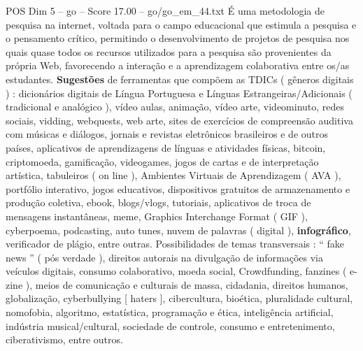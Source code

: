 \begin{textsample}{POS Dim 5 – go – Score 17.00 – go/go\_em\_44.txt}
É uma metodologia de pesquisa na internet, voltada para o campo educacional que estimula a pesquisa e o pensamento crítico, permitindo o desenvolvimento de projetos de pesquisa nos quais quase todos os recursos utilizados para a pesquisa são provenientes da própria Web, favorecendo a interação e a aprendizagem colaborativa entre os/as estudantes. \textbf{Sugestões} de ferramentas que compõem as TDICs ( gêneros digitais ) : dicionários digitais de Língua Portuguesa e Línguas Estrangeiras/Adicionais ( tradicional e analógico ), vídeo aulas, animação, vídeo arte, videominuto, redes sociais, vidding, webquests, web arte, sites de exercícios de compreensão auditiva com músicas e diálogos, jornais e revistas eletrônicos brasileiros e de outros países, aplicativos de aprendizagens de línguas e atividades físicas, bitcoin, criptomoeda, gamificação, videogames, jogos de cartas e de interpretação artística, tabuleiros ( on line ), Ambientes Virtuais de Aprendizagem ( AVA ), portfólio interativo, jogos educativos, dispositivos gratuitos de armazenamento e produção coletiva, ebook, blogs/vlogs, tutoriais, aplicativos de troca de mensagens instantâneas, meme, Graphics Interchange Format ( GIF ), cyberpoema, podcasting, auto tunes, nuvem de palavras ( digital ), \textbf{infográfico}, verificador de plágio, entre outras.
Possibilidades de temas transversais : “ fake news ” ( pós verdade ), direitos autorais na divulgação de informações via veículos digitais, consumo colaborativo, moeda social, Crowdfunding, fanzines ( e-zine ), meios de comunicação e culturais de massa, cidadania, direitos humanos, globalização, cyberbullying [ haters ], cibercultura, bioética, pluralidade cultural, nomofobia, algoritmo, estatística, programação e ética, inteligência artificial, indústria musical/cultural, sociedade de controle, consumo e entretenimento, ciberativismo, entre outros.

\end{textsample}
